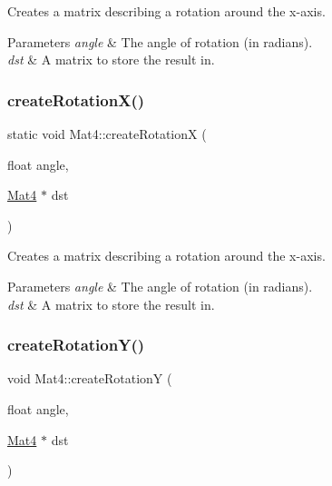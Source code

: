 Creates a matrix describing a rotation around the x-\/axis.


\begin{DoxyParams}{Parameters}
{\em angle} & The angle of rotation (in radians). \\
\hline
{\em dst} & A matrix to store the result in. \\
\hline
\end{DoxyParams}
\mbox{\label{classMat4_ada6553ab3869aca6190523862bcbbb98}} 
\subsubsection{\texorpdfstring{create\+Rotation\+X()}{createRotationX()}\hspace{0.1cm}{\footnotesize\ttfamily [2/2]}}
{\footnotesize\ttfamily static void Mat4\+::create\+RotationX (\begin{DoxyParamCaption}\item[{float}]{angle,  }\item[{\hyperlink{classMat4}{Mat4} $\ast$}]{dst }\end{DoxyParamCaption})\hspace{0.3cm}{\ttfamily [static]}}

Creates a matrix describing a rotation around the x-\/axis.


\begin{DoxyParams}{Parameters}
{\em angle} & The angle of rotation (in radians). \\
\hline
{\em dst} & A matrix to store the result in. \\
\hline
\end{DoxyParams}
\mbox{\label{classMat4_ab81524e7fbb339f6a7c5a43d701fdbc7}} 
\subsubsection{\texorpdfstring{create\+Rotation\+Y()}{createRotationY()}\hspace{0.1cm}{\footnotesize\ttfamily [1/2]}}
{\footnotesize\ttfamily void Mat4\+::create\+RotationY (\begin{DoxyParamCaption}\item[{float}]{angle,  }\item[{\hyperlink{classMat4}{Mat4} $\ast$}]{dst }\end{DoxyParamCaption})\hspace{0.3cm}{\ttfamily [static]}}

